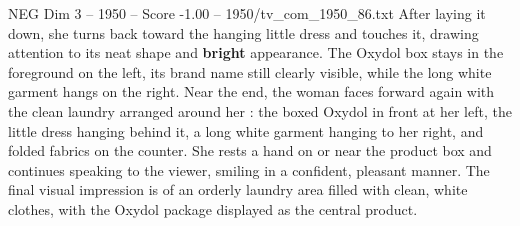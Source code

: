\begin{textsample}{NEG Dim 3 – 1950 – Score -1.00 – 1950/tv\_com\_1950\_86.txt}
After laying it down, she turns back toward the hanging little dress and touches it, drawing attention to its neat shape and \textbf{bright} appearance.
The Oxydol box stays in the foreground on the left, its brand name still clearly visible, while the long white garment hangs on the right.
Near the end, the woman faces forward again with the clean laundry arranged around her : the boxed Oxydol in front at her left, the little dress hanging behind it, a long white garment hanging to her right, and folded fabrics on the counter.
She rests a hand on or near the product box and continues speaking to the viewer, smiling in a confident, pleasant manner.
The final visual impression is of an orderly laundry area filled with clean, white clothes, with the Oxydol package displayed as the central product.

\end{textsample}
